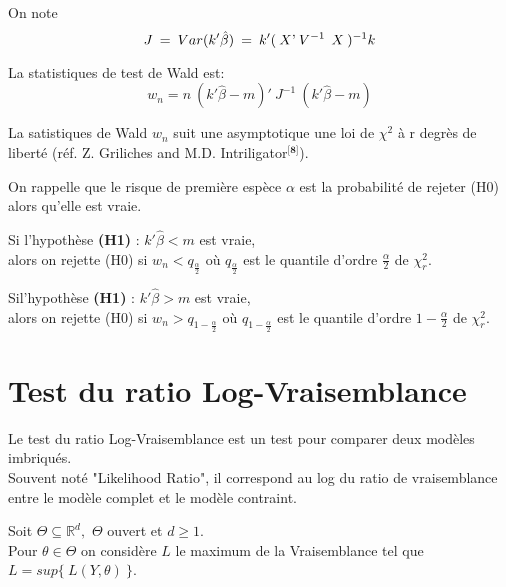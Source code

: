 \documentclass[11pt,fleqn]{book} %
\begin{document}
  \vspace{1em}
  
  On note 
  \[
  J\:=\:Var(k'\hat{\beta})\:=\:k' (\:X\textnormal{'} \:V^{-1}\:\: X\:)^{-1} k
  \]
 
  \vspace{1em}
  
 La statistiques de test de Wald est: 
 \[
 w_n=n\:(k'\hat{\beta}-m)'\:J^{-1}\:(k'\hat{\beta}-m) 
 \]
\vspace{1em}

La satistiques de Wald $w_n$ suit une asymptotique une loi de $\chi^2$ à r degrès de liberté (réf.  Z. Griliches and M.D. Intriligator$^{\textbf{[8]}}$). 

\vspace{1em}

On rappelle que le risque de première espèce $\alpha$ est la probabilité de rejeter (H0) alors qu'elle est vraie. 

\vspace{1em}

Si l'hypothèse \textbf{(H1)} :  \: $k'\hat{\beta} < m$ est vraie,\\
alors on rejette (H0) si \: $w_n < q_{\frac{\alpha}{2}}$ \:où\: $q_{\frac{\alpha}{2}}$ est le quantile d'ordre $\frac{\alpha}{2}$ de $\chi_r^2$.

\vspace{1em}

Sil'hypothèse \textbf{(H1)} :  \: $k'\hat{\beta} > m$ est vraie,\\
alors on rejette (H0) si \: $w_n > q_{1-\frac{\alpha}{2}}$ \:où\: $q_{1-\frac{\alpha}{2}}$ est le quantile d'ordre $1-\frac{\alpha}{2}$ de $\chi_r^2$.


\newpage

\section{Test du ratio Log-Vraisemblance}

\vspace{1em}

Le test du ratio Log-Vraisemblance est un test pour comparer deux modèles imbriqués.\\ 
Souvent noté "Likelihood Ratio", il correspond au log du ratio de vraisemblance entre le modèle complet et le modèle contraint.

\vspace{1em}

Soit $\Theta\subseteq \mathbb{R}^d,$ $\Theta$ ouvert et $d\geq 1$.\\ Pour $\theta\in\Theta$ on considère $L$ le maximum de la Vraisemblance tel que $L=sup\{\:L(Y,\theta)\:\}$. 
\end{document}
